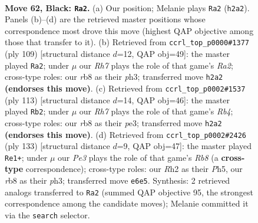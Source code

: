 \documentclass[11pt]{article}
\begin{document}
\clearpage

\begin{figure}[p]\centering
\begin{subfigure}{0.46\textwidth}\centering
\resizebox{\linewidth}{!}{%
\newchessgame
\chessboard[
  setfen={1R6/3R1pk1/4p3/8/P3P3/4KP2/7r/8 b - - 16 62},
  showmover=false,
  pgfstyle=straightmove, color=movearrow, markmove={h2-a2}
]}
\caption{}
\end{subfigure}\hfill
\begin{subfigure}{0.46\textwidth}\centering
\resizebox{\linewidth}{!}{%
\newchessgame
\chessboard[
  setfen={8/r7/4R1pk/7p/8/6PP/5PK1/8 b - - 10 55},
  showmover=false,
  pgfstyle=straightmove, color=movearrow, markmove={a7-a2}
]}
\caption{}
\end{subfigure}
\\[4pt]
\begin{subfigure}{0.46\textwidth}\centering
\resizebox{\linewidth}{!}{%
\newchessgame
\chessboard[
  setfen={8/3R1pk1/6p1/1r6/6KP/4P3/5P2/8 b - - 0 57},
  showmover=false,
  pgfstyle=straightmove, color=movearrow, markmove={b5-b2}
]}
\caption{}
\end{subfigure}\hfill
\begin{subfigure}{0.46\textwidth}\centering
\resizebox{\linewidth}{!}{%
\newchessgame
\chessboard[
  setfen={8/8/3R1pk1/7p/4P3/4KP1P/8/1r6 b - - 19 67},
  showmover=false,
  pgfstyle=straightmove, color=movearrow, markmove={b1-e1}
]}
\caption{}
\end{subfigure}
\caption{\textbf{Move 62, Black: \texttt{Ra2}.} (a) Our position; Melanie plays \texttt{Ra2} (\texttt{h2a2}). Panels (b)--(d) are the retrieved master positions whose correspondence most drove this move (highest QAP objective among those that transfer to it). (b) Retrieved from \texttt{ccrl\_top\_p0000\#1377} (ply 109) [structural distance $d$=12, QAP obj=49]: the master played \texttt{Ra2}; under $\mu$ our \emph{Rh7} plays the role of that game's \emph{Ra2}; cross-type roles: our \emph{r}b8 as their \emph{p}h3; transferred move \texttt{h2a2} \textbf{(endorses this move)}. (c) Retrieved from \texttt{ccrl\_top\_p0002\#1537} (ply 113) [structural distance $d$=14, QAP obj=46]: the master played \texttt{Rb2}; under $\mu$ our \emph{Rh7} plays the role of that game's \emph{Rb4}; cross-type roles: our \emph{r}b8 as their \emph{p}e3; transferred move \texttt{h2a2} \textbf{(endorses this move)}. (d) Retrieved from \texttt{ccrl\_top\_p0002\#2426} (ply 133) [structural distance $d$=9, QAP obj=47]: the master played \texttt{Re1+}; under $\mu$ our \emph{Pe3} plays the role of that game's \emph{Rb8} (a \textbf{cross-type} correspondence); cross-type roles: our \emph{R}h2 as their \emph{P}h5, our \emph{r}b8 as their \emph{p}h3; transferred move \texttt{e6e5}. Synthesis: 2 retrieved analogs transferred to \texttt{Ra2} (summed QAP objective 95, the strongest correspondence among the candidate moves); Melanie committed it via the \texttt{search} selector.}
\label{fig:thought-m123}
\end{figure}
\end{document}
